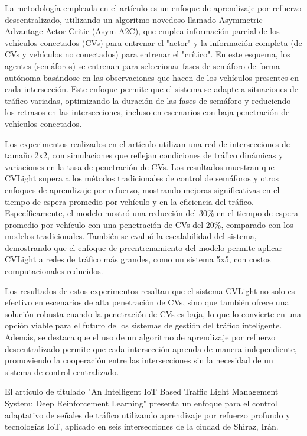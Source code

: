 La metodología empleada en el artículo es un enfoque de aprendizaje por refuerzo descentralizado, utilizando un algoritmo novedoso llamado Asymmetric Advantage Actor-Critic (Asym-A2C), que emplea información parcial de los vehículos conectados (CVs) para entrenar el "actor" y la información completa (de CVs y vehículos no conectados) para entrenar el "crítico". En este esquema, los agentes (semáforos) se entrenan para seleccionar fases de semáforo de forma autónoma basándose en las observaciones que hacen de los vehículos presentes en cada intersección. Este enfoque permite que el sistema se adapte a situaciones de tráfico variadas, optimizando la duración de las fases de semáforo y reduciendo los retrasos en las intersecciones, incluso en escenarios con baja penetración de vehículos conectados.

Los experimentos realizados en el artículo utilizan una red de intersecciones de tamaño 2x2, con simulaciones que reflejan condiciones de tráfico dinámicas y variaciones en la tasa de penetración de CVs. Los resultados muestran que CVLight supera a los métodos tradicionales de control de semáforos y otros enfoques de aprendizaje por refuerzo, mostrando mejoras significativas en el tiempo de espera promedio por vehículo y en la eficiencia del tráfico. Específicamente, el modelo mostró una reducción del 30\% en el tiempo de espera promedio por vehículo con una penetración de CVs del 20\%, comparado con los modelos tradicionales. También se evaluó la escalabilidad del sistema, demostrando que el enfoque de preentrenamiento del modelo permite aplicar CVLight a redes de tráfico más grandes, como un sistema 5x5, con costos computacionales reducidos.

Los resultados de estos experimentos resaltan que el sistema CVLight no solo es efectivo en escenarios de alta penetración de CVs, sino que también ofrece una solución robusta cuando la penetración de CVs es baja, lo que lo convierte en una opción viable para el futuro de los sistemas de gestión del tráfico inteligente. Además, se destaca que el uso de un algoritmo de aprendizaje por refuerzo descentralizado permite que cada intersección aprenda de manera independiente, promoviendo la cooperación entre las intersecciones sin la necesidad de un sistema de control centralizado.

El artículo de \cite{Damadam2022} titulado "An Intelligent IoT Based Traffic Light Management System: Deep Reinforcement Learning" presenta un enfoque para el control adaptativo de señales de tráfico utilizando aprendizaje por refuerzo profundo y tecnologías IoT, aplicado en seis intersecciones de la ciudad de Shiraz, Irán.

